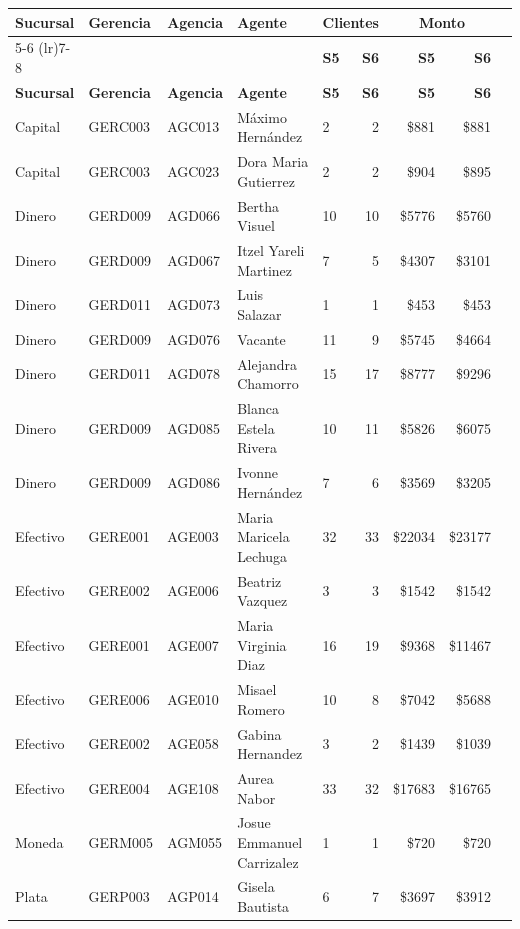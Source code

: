 \documentclass[11pt,a4paper]{article}
\newcommand{\money}[1]{\$\num{#1}}
\begin{document}
\begin{center}
\renewcommand{\arraystretch}{1.3}
\footnotesize
\begin{longtable}{lllllrrrr}
\toprule
\textbf{Sucursal} & \textbf{Gerencia} & \textbf{Agencia} & \textbf{Agente}
  & \multicolumn{2}{c}{\textbf{Clientes}} & \multicolumn{2}{c}{\textbf{Monto}} \\
\cmidrule(lr){5-6} \cmidrule(lr){7-8}
& & & & \textbf{S5} & \textbf{S6} & \textbf{S5} & \textbf{S6} \\
\midrule
\endfirsthead
\toprule
\textbf{Sucursal} & \textbf{Gerencia} & \textbf{Agencia} & \textbf{Agente}
  & \textbf{S5} & \textbf{S6} & \textbf{S5} & \textbf{S6} \\
\midrule
\endhead
Capital & GERC003 & AGC013 & Máximo Hernández & 2 & 2 & \money{881} & \money{881} \\
Capital & GERC003 & AGC023 & Dora Maria Gutierrez & 2 & 2 & \money{904} & \money{895} \\
Dinero & GERD009 & AGD066 & Bertha Visuel & 10 & 10 & \money{5776} & \money{5760} \\
Dinero & GERD009 & AGD067 & Itzel Yareli Martinez & 7 & 5 & \money{4307} & \money{3101} \\
Dinero & GERD011 & AGD073 & Luis Salazar & 1 & 1 & \money{453} & \money{453} \\
Dinero & GERD009 & AGD076 & Vacante & 11 & 9 & \money{5745} & \money{4664} \\
Dinero & GERD011 & AGD078 & Alejandra Chamorro & 15 & 17 & \money{8777} & \money{9296} \\
Dinero & GERD009 & AGD085 & Blanca Estela Rivera & 10 & 11 & \money{5826} & \money{6075} \\
Dinero & GERD009 & AGD086 & Ivonne Hernández & 7 & 6 & \money{3569} & \money{3205} \\
Efectivo & GERE001 & AGE003 & Maria Maricela Lechuga & 32 & 33 & \money{22034} & \money{23177} \\
Efectivo & GERE002 & AGE006 & Beatriz Vazquez & 3 & 3 & \money{1542} & \money{1542} \\
Efectivo & GERE001 & AGE007 & Maria Virginia Diaz & 16 & 19 & \money{9368} & \money{11467} \\
Efectivo & GERE006 & AGE010 & Misael Romero & 10 & 8 & \money{7042} & \money{5688} \\
Efectivo & GERE002 & AGE058 & Gabina Hernandez & 3 & 2 & \money{1439} & \money{1039} \\
Efectivo & GERE004 & AGE108 & Aurea Nabor & 33 & 32 & \money{17683} & \money{16765} \\
Moneda & GERM005 & AGM055 & Josue Emmanuel Carrizalez & 1 & 1 & \money{720} & \money{720} \\
Plata & GERP003 & AGP014 & Gisela Bautista & 6 & 7 & \money{3697} & \money{3912} \\

\bottomrule
\end{longtable}
\end{center}
\end{document}
